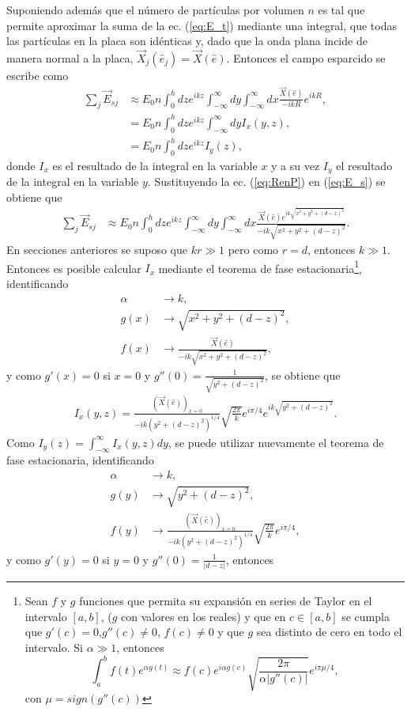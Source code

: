 \documentclass[letterpaper, 12pt] {article}
\begin{document}
Suponiendo además que el número de partículas por volumen $n$ es tal que permite aproximar la suma de la ec. (\eqref{eq:E_t}) mediante una integral, que todas las partículas en la placa son idénticas y, dado que la onda plana incide de manera normal a la placa, $\vec{X}_j(\hat{e}_j) = \vec{X}(\hat{e})$. Entonces el campo esparcido se escribe como
\begin{align}
\sum_j \vec{E}_{sj} &\approx E_0 n
							 \int_0^h dz e^{ikz} 
							 \int_{-\infty}^\infty dy
							 \int_{-\infty}^\infty dx \frac{\vec{X}(\hat{e})}{-ikR} e^{ikR},\label{eq:E_s}  \\
				& = E_0 n \int_0^h dz e^{ikz}  \int_{-\infty}^\infty dy I_x(y,z),\\
				&= E_0 n \int_0^h dz e^{ikz}  I_y(z),
\end{align}
donde $I_x$ es el resultado de la integral en la variable $x$ y a su vez $I_y$ el resultado de la integral en la variable $y$. Sustituyendo la ec. (\ref{eq:RenP}) en (\ref{eq:E_s}) se obtiene que 
\begin{align}
\sum_j \vec{E}_{sj} &\approx E_0 n
							 \int_0^h dz e^{ikz} 
							 \int_{-\infty}^\infty dy
							 \int_{-\infty}^\infty dx 
			\frac{\vec{X}(\hat{e})    e^{ik\sqrt{x^2 + y^2 + (d-z)^2}}}
			{-ik \sqrt{x^2 + y^2 + (d-z)^2}}.
\end{align}
En secciones anteriores se suposo que $k r \gg 1$ pero como $r=d$, entonces $k\gg1$. Entonces es posible calcular $I_x$ mediante el teorema de fase estacionaria\footnote{Sean $f$ y $g$  funciones que permita su expansión en series de Taylor en el intervalo $[a,b]$, ($g$  con valores en los reales) y que en $c\in[a,b]$ se cumpla que $g'(c) = 0$,$g''(c) \not= 0$, $f(c)\not= 0$ y que $g$ sea distinto de cero en todo el intervalo. Si $\alpha \gg 1$, entonces
\begin{equation}
\int_a^b f(t) e^{\alpha g(t)} \approx f(c) e^{i\alpha g(c)}\sqrt{\frac{2\pi}{\alpha |g''(c)|}}e^{i\pi\mu/4},
\end{equation}
 con $\mu = sign(g''(c))$}, identificando 
 \begin{align*}
 \alpha &\rightarrow k, \\
 g(x) &\rightarrow \sqrt{x^2 + y^2 + (d-z)^2}, \\
 f(x) &\rightarrow  \frac{\vec{X}(\hat{e}) }{-ik \sqrt{x^2 + y^2 + (d-z)^2}},
 \end{align*}
y como $g'(x)=0$ si $x=0$ y $g''(0) = \frac{1}{\sqrt{y^2+(d-z)^2}}$, se obtiene que
\begin{align}
I_x (y,z) = \frac{(\vec{X}(\hat{e}))_{x=0} }{-ik (y^2+(d-z)^2)^{1/4}} \sqrt{\frac{2\pi}{k}} e^{i\pi/4}   e^{ik\sqrt{y^2+(d-z)^2}}.  \label{eq:Ix}
\end{align}
Como $I_y (z) = \int_{-\infty}^{\infty} I_x(y,z) dy$, se puede utilizar nuevamente el teorema de fase estacionaria, identificando 
 \begin{align*}
 \alpha &\rightarrow k, \\
 g(y) &\rightarrow \sqrt{ y^2 + (d-z)^2}, \\
 f(y) &\rightarrow  \frac{(\vec{X}(\hat{e}))_{x=0} }{-ik (y^2+(d-z)^2)^{1/4}} \sqrt{\frac{2\pi}{k}} e^{i\pi/4},
 \end{align*}
y como $g'(y)=0$ si $y=0$ y $g''(0) = \frac{1}{|d-z|}$, entonces
\end{document}
